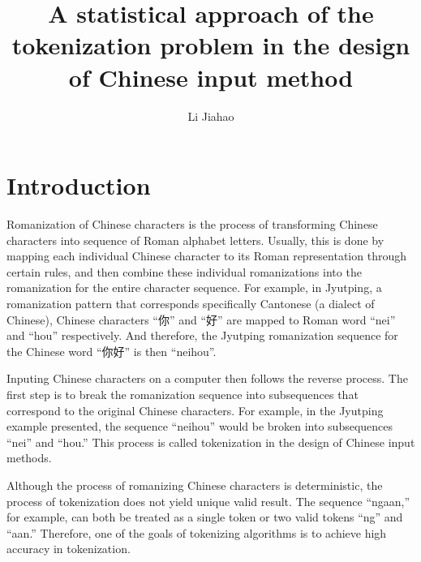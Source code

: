 \documentclass[a4paper,11pt,twocolumn]{article}
\title{A statistical approach of the tokenization problem in the design of Chinese input method}
\date{\vspace{-5ex}}
\author{Li Jiahao}
\begin{document}



\section{Introduction}

Romanization of Chinese characters is the process of transforming Chinese characters into sequence of Roman alphabet letters. Usually, this is done by mapping each individual Chinese character to its Roman representation through certain rules, and then combine these individual romanizations into the romanization for the entire character sequence. For example, in Jyutping, a romanization pattern that corresponds specifically Cantonese (a dialect of Chinese), Chinese characters ``{\song 你}'' and ``{\song 好}'' are mapped to Roman word ``nei'' and ``hou'' respectively. And therefore, the Jyutping romanization sequence for the Chinese word ``{\song 你好}'' is then ``neihou''.

Inputing Chinese characters on a computer then follows the reverse process. The first step is to break the romanization sequence into subsequences that correspond to the original Chinese characters. For example, in the Jyutping example presented, the sequence ``neihou'' would be broken into subsequences ``nei'' and ``hou.'' This process is called tokenization in the design of Chinese input methods. \cite{token}

Although the process of romanizing Chinese characters is deterministic, the process of tokenization does not yield unique valid result. \cite{jp} The sequence ``ngaan,'' for example, can both be treated as a single token or two valid tokens ``ng'' and ``aan.'' Therefore, one of the goals of tokenizing algorithms is to achieve high accuracy in tokenization.
\end{document}
